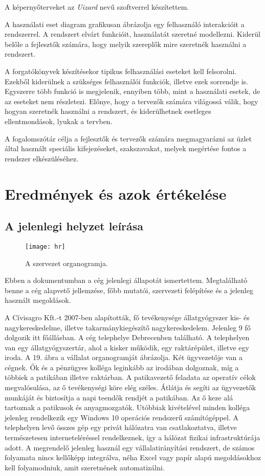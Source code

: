 \documentclass[12pt]{article}
\begin{document}
A képernyőterveket az \textit{Uizard} nevű szoftverrel készítettem.

A használati eset diagram grafikusan ábrázolja egy felhasználó interakcióit a rendszerrel. A rendszert elvárt funkcióit, használatát szeretné modellezni. Kiderül belőle a fejlesztők számára, hogy melyik szereplők mire szeretnék használni a rendszert.

A forgatókönyvek készítésekor tipikus felhasználási eseteket kell felsorolni. Ezekből kiderülnek a szükséges felhasználói funkciók, illetve ezek sorrendje is. Egyszerre több funkció is megjelenik, ennyiben több, mint a használati esetek, de az eseteket nem részletezi. Előnye, hogy a tervezők számára világossá válik, hogy hogyan szeretnék használni a rendszert, és kiderülhetnek esetleges ellentmondások, lyukak a tervben.

A fogalomszótár célja a fejlesztők és tervezők számára megmagyarázni az üzlet által használt speciális kifejezéseket, szakszavakat, melyek megértése fontos a rendszer elkészüléséhez.

\newpage
\section{Eredmények és azok értékelése}

\subsection{A jelenlegi helyzet leírása}

\begin{wrapfigure}{r}{0.5\textwidth}
\texttt{[image: hr]}
\caption{A szervezet organogramja.}
\end{wrapfigure}

Ebben a dokumentumban a cég jelenlegi állapotát ismertettem. Megtalálható benne a cég alapvető jellemzése, főbb mutatói, szervezeti felépítése és a jelenleg használt megoldások.

 A Cívisagro Kft.-t 2007-ben alapították, fő tevékenysége állatgyógyszer kis- és nagykereskedelme, illetve takarmánykiegészítő nagykereskedelem. Jelenleg 9 fő dolgozik itt főállásban. A cég telephelye Debrecenben található. A telephelyen van egy állatgyógyszertár, ahol a kisker működik, egy raktárépület, illetve egy iroda.
A 19. ábra a vállalat organogramját ábrázolja. Két ügyvezetője van a cégnek. Ők és a pénzügyes kolléga leginkább az irodában dolgoznak, míg a többiek a patikában illetve raktárban. A patikavezető feladata az operatív célok megvalósulása, az ő tevékenységi köre elég széles. Átlátja és segíti az ügyvezetők munkáját és biztosítja a napi teendők rendjét a patikában. Az ő keze alá tartoznak a patikusok és anyagmozgatók.
Utóbbiak kivételével minden kolléga jelenleg rendelkezik egy Windows 10 operációs rendszerű számítógéppel. A telephelyen levő összes gép egy privát hálózatra van csatlakoztatva, illetve természetesen interneteléréssel rendelkeznek, így a hálózat fizikai infrastruktúrája adott. A megrendelő jelenleg használ egy vállalatirányítási rendszert, de számos folyamata nincs kellőképp integrálva, néha Excel vagy papír alapú megoldásokhoz kell folyamodniuk, amit szeretnének automatizálni.
\end{document}
